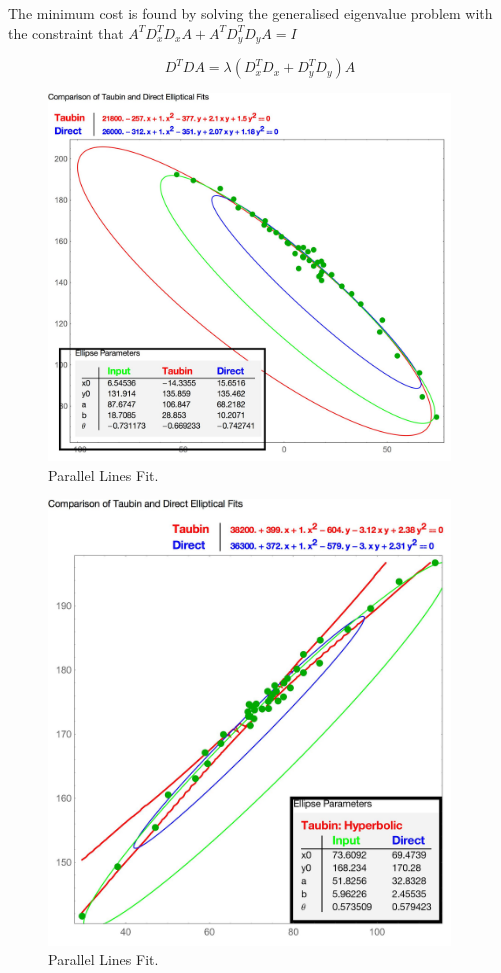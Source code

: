The minimum cost is found by solving the generalised eigenvalue problem with the constraint that $ A^T D_x^T D_x A +  A^T D_y^T D_y A = I$

\begin{equation}
 D^T D A = \lambda  \left( D_x^T D_x +  D_y^T D_y\right) A 
\end{equation}


\begin{figure}[h!]
  \centering
    \includegraphics[width=0.95\textwidth]{Chapter4/Figs/EllipticalFitTest_44.jpg}
    \caption{Parallel Lines Fit.}\label{fig:ParallelFit}
\end{figure}
\begin{figure}[h!]
  \centering
    \includegraphics[width=0.95\textwidth]{Chapter4/Figs/EllipticalFitTest_Hyperbolic.jpg}
    \caption{Parallel Lines Fit.}\label{fig:ParallelFit}
\end{figure}
